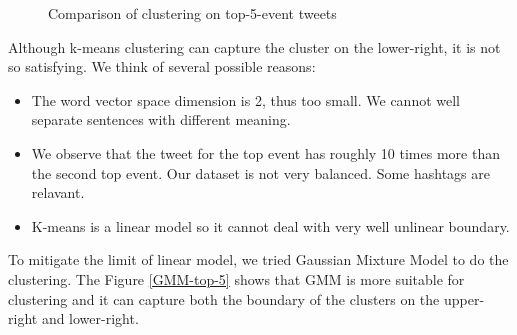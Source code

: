 \begin{figure}[ht]
    \centering
    \qquad
    \caption{Comparison of clustering on top-5-event tweets}
    \label{k-means-top-5}
\end{figure}

Although k-means clustering can capture the cluster on the lower-right, it is not so satisfying. We think of several possible reasons:

\begin{itemize}
    \item The word vector space dimension is 2, thus too small. We cannot well separate sentences with different meaning.
    \item We observe that the tweet for the top event has roughly 10 times more than the second top event. Our dataset is not very balanced. Some hashtags are relavant.
    \item K-means is a linear model so it cannot deal with very well unlinear boundary.
\end{itemize}

To mitigate the limit of linear model, we tried Gaussian Mixture Model to do the clustering. The Figure \ref{GMM-top-5} shows that GMM is more suitable for clustering and it can capture both the boundary of the clusters on the upper-right and lower-right.

